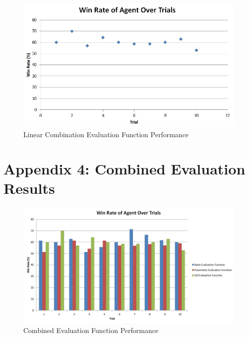 \documentclass[12pt]{article}
\begin{document}
\begin{figure}[htbp]
\centering
\caption{Linear Combination Evaluation Function Performance}
\includegraphics[scale=0.9]{linear-combination-evaluation-function-results.JPG}
\end{figure}

\clearpage
\section{Appendix 4: Combined Evaluation Results}
\begin{figure}[htbp]
\centering
\caption{Combined Evaluation Function Performance}
\includegraphics[scale=0.6]{combined-evaluation-function.JPG}
\end{figure}
\end{document}
